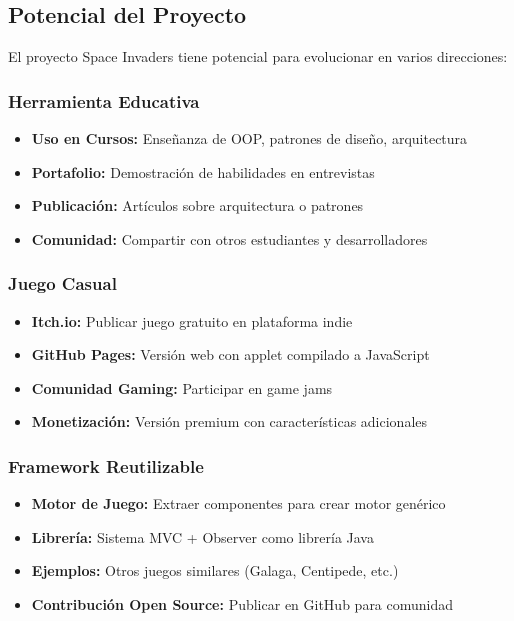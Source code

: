 \documentclass[12pt, a4paper]{article}
\begin{document}
\subsection{Potencial del Proyecto}

El proyecto Space Invaders tiene potencial para evolucionar en varios direcciones:

\subsubsection{Herramienta Educativa}

\begin{itemize}[leftmargin=2em]
    \item \textbf{Uso en Cursos:} Enseñanza de OOP, patrones de diseño, arquitectura
    \item \textbf{Portafolio:} Demostración de habilidades en entrevistas
    \item \textbf{Publicación:} Artículos sobre arquitectura o patrones
    \item \textbf{Comunidad:} Compartir con otros estudiantes y desarrolladores
\end{itemize}

\subsubsection{Juego Casual}

\begin{itemize}[leftmargin=2em]
    \item \textbf{Itch.io:} Publicar juego gratuito en plataforma indie
    \item \textbf{GitHub Pages:} Versión web con applet compilado a JavaScript
    \item \textbf{Comunidad Gaming:} Participar en game jams
    \item \textbf{Monetización:} Versión premium con características adicionales
\end{itemize}

\subsubsection{Framework Reutilizable}

\begin{itemize}[leftmargin=2em]
    \item \textbf{Motor de Juego:} Extraer componentes para crear motor genérico
    \item \textbf{Librería:} Sistema MVC + Observer como librería Java
    \item \textbf{Ejemplos:} Otros juegos similares (Galaga, Centipede, etc.)
    \item \textbf{Contribución Open Source:} Publicar en GitHub para comunidad
\end{itemize}
\end{document}
